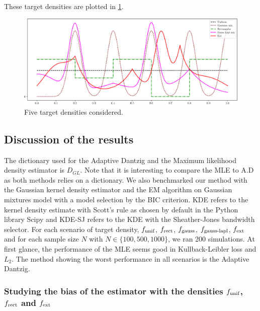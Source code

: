 These target densities are plotted in \cref{fig:target_densities}.
\begin{figure}[h]
\includegraphics[width=1.1\textwidth]{TeX_files/densities_f_star.png}
\caption{Five target densities considered.}
\label{fig:target_densities}
\end{figure}

\subsection{Discussion of the results}
The dictionary used for the Adaptive Dantzig and the Maximum likelihood density estimator is $D_{GL}$. Note that it is interesting to compare the MLE to A.D as both methods relies on a dictionary. We also benchmarked our method with the Gaussian kernel density estimator and the EM algorithm on Gaussian mixtures model with a model selection by the BIC criterion. KDE refers to the kernel density estimate with Scott's rule as chosen by default in the Python library Scipy and KDE-SJ refers to the KDE with the Sheather-Jones bandwidth selector. For each scenario of target density, $f_{\textnormal{unif}}$, $f_{\textnormal{rect}}$, $f_{\textnormal{gauss}}$, $f_{\textnormal{gauss-lapl}}$, $f_{\textnormal{ext}}$ and for each sample size $N$  with $N\in\{100, 500, 1000\}$, we ran 200 simulations. At first glance, the performance of the MLE seems good in Kullback-Leibler loss and $L_2$. The method showing the worst performance in all scenarios is the Adaptive Dantzig.

\subsubsection{Studying the bias of the estimator with the densities $f_{\textnormal{unif}}$, $f_{\textnormal{rect}}$ and $f_{\textnormal{ext}}$}

